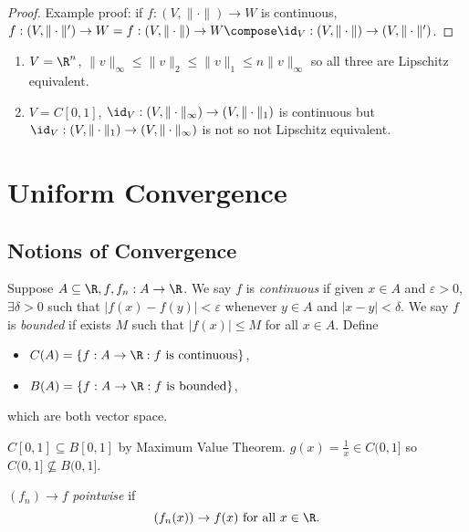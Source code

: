 \documentclass[a4paper]{article}
\theoremstyle{definition}
\begin{document}
\begin{proof}
  Example proof: if \(f:(V, \|\cdot\|)\to W\) is continuous, \(f:(V,\|\cdot\|')\to W = f:(V, \|\cdot\|)\to W \compose \id_V:(V, \|\cdot\|) \to (V, \|\cdot\|')\).
\end{proof}

\begin{eg}\leavevmode
  \begin{enumerate}
  \item \(V=\R^n\), \(\|v\|_\infty \leq \|v\|_2 \leq \|v\|_1 \leq n \|v\|_\infty\) so all three are Lipschitz equivalent.
  \item \(V=C[0,1]\), \(\id_V:(V, \|\cdot\|_\infty)\to (V,\|\cdot\|_1)\) is continuous but \(\id_V:(V, \|\cdot\|_1)\to (V,\|\cdot\|_\infty)\) is not so not Lipschitz equivalent.
  \end{enumerate}
\end{eg}

\section{Uniform Convergence}

\subsection{Notions of Convergence}

Suppose \(A\subseteq \R, f, f_n: A\to \R\). We say \(f\) is \emph{continuous} if given \(x\in A\) and \(\varepsilon>0\), \(\exists \delta>0\) such that \(|f(x)-f(y)| < \varepsilon\) whenever \(y\in A\) and \(|x-y| < \delta\). We say \(f\) is \emph{bounded} if exists \(M\) such that \(|f(x)| \leq M\) for all \(x\in A\). Define
\begin{itemize}
\item \(C(A) = \{f: A\to \R: f \text{ is continuous}\}\),
\item \(B(A) = \{f:A\to \R: f \text{ is bounded}\}\),
\end{itemize}
which are both vector space.

\begin{eg}
  \(C[0,1] \subseteq B[0,1]\) by Maximum Value Theorem. \(g(x) = \frac{1}{x} \in C(0,1]\) so \(C(0,1] \nsubseteq B(0,1]\).
\end{eg}

\begin{definition}
  \((f_n) \to f\) \emph{pointwise} if
  \[
    (f_n(x)) \to f(x) \text{ for all } x\in \R.
    \]
\end{definition}
\end{document}
